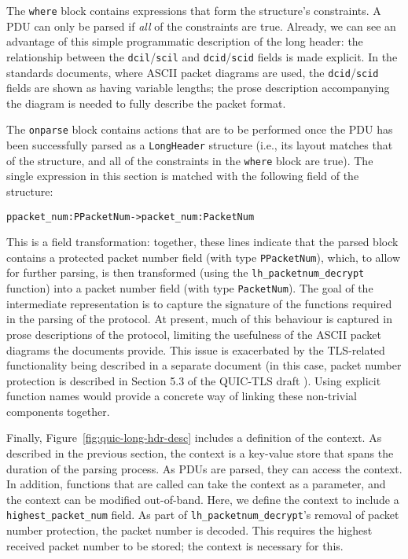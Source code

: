 \documentclass[10pt,sigconf]{acmart}
\begin{document}
The \texttt{where} block contains expressions that form the structure's constraints. A PDU
can only be parsed if \emph{all} of the constraints are true. Already, we can see an
advantage of this simple programmatic description of the long header: the relationship
between the \texttt{dcil}/\texttt{scil} and \texttt{dcid}/\texttt{scid} fields is made
explicit. In the standards documents, where ASCII packet diagrams are used, the
\texttt{dcid}/\texttt{scid} fields are shown as having variable lengths; the prose
description accompanying the diagram is needed to fully describe the packet format.

The \texttt{onparse} block contains actions that are to be performed once the PDU has been
successfully parsed as a \texttt{LongHeader} structure (i.e., its layout matches that of
the structure, and all of the constraints in the \texttt{where} block are true). The
single expression in this section is matched with the following field of the structure:
\footnotesize
\begin{alltt}
    ppacket_num : PPacketNum -> packet_num : PacketNum
\end{alltt}
\normalsize
This is a field transformation: together, these lines indicate that the parsed block
contains a protected packet number field (with type \texttt{PPacketNum}), which, to allow
for further parsing, is then transformed (using the \texttt{lh\_packetnum\_decrypt} function)
into a packet number field (with type \texttt{PacketNum}). The goal of the intermediate
representation is to capture the signature of the functions required in the parsing of the
protocol. At present, much of this behaviour is captured in prose descriptions of the
protocol, limiting the usefulness of the ASCII packet diagrams the documents provide.
This issue is exacerbated by the TLS-related functionality being described in a separate
document (in this case, packet number protection is described in Section 5.3 of the
QUIC-TLS draft \cite{draft-ietf-quic-tls-14}). Using explicit function names would provide
a concrete way of linking these non-trivial components together. 

Finally, Figure~\ref{fig:quic-long-hdr-desc} includes a definition of the context. As
described in the previous section, the context is a key-value store that spans the duration
of the parsing process. As PDUs are parsed, they can access the context. In addition,
functions that are called can take the context as a parameter, and the context can be
modified out-of-band. Here, we define the context to include a \texttt{highest\_packet\_num}
field. As part of \texttt{lh\_packetnum\_decrypt}'s removal of packet number protection,
the packet number is decoded. This requires the highest received packet number to be
stored; the context is necessary for this.
\end{document}
